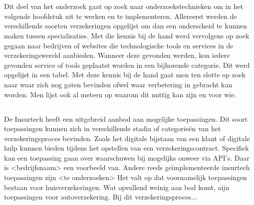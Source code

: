 
\chapter{}
\label{ch:voorbereiding-onderzoek}

\section{}
\label{sec:inleiding}

Dit deel van het onderzoek gaat op zoek naar onderzoekstechnieken om in het volgende hoofdstuk uit te werken en te implementeren.
Allereerst werden de verschillende soorten verzekeringen opgelijst om dan een onderscheid te kunnen maken tussen specialisaties.
Met die kennis bij de hand werd vervolgens op zoek gegaan naar bedrijven of websites die technologische tools en services in de verzekeringswereld aanbieden. Wanneer deze gevonden werden, kon iedere gevonden service of tools geplaatst worden in een bijhorende categorie. Dit werd opgelijst in een tabel.
Met deze kennis bij de hand gaat men ten slotte op zoek naar waar zich nog gaten bevinden ofwel waar verbetering in gebracht kan worden. Men lijst ook al meteen op waarom dit nuttig kan zijn en voor wie.

\section{}
\label{sec:bestaande-toepassingen}

De Insurtech heeft een uitgebreid aanbod aan mogelijke toepassingen. Dit soort toepassingen kunnen zich in verschillende stadia of categorieën van het verzekeringsproces bevinden. Zoals het digitale bijstaan van een klant of digitale hulp kunnen bieden tijdens het opstellen van een verzekeringscontract. Specifiek kan een toepassing gaan over waarschuwen bij mogelijks onweer via API’s. Daar is <bedrijfsnaam> een voorbeeld van. Andere reeds geïmplementeerde insurtech toepassingen zijn <te onderzoeken>
Het valt op dat voornamelijk toepassingen bestaan voor huisverzekeringen.
Wat opvallend weinig aan bod komt, aijn toepassingen voor autoverzekering. Bij dit verzekeringsproces...

